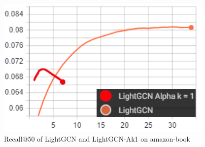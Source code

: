 \begin{figure}
    \includegraphics[width=\linewidth]{figures/alpha-k-results/amazon-recall.png}
    \caption{Recall@50 of LightGCN and LightGCN-Ak1 on amazon-book}
    \label{fig:recall-amazon-alpha-k}
\end{figure}

